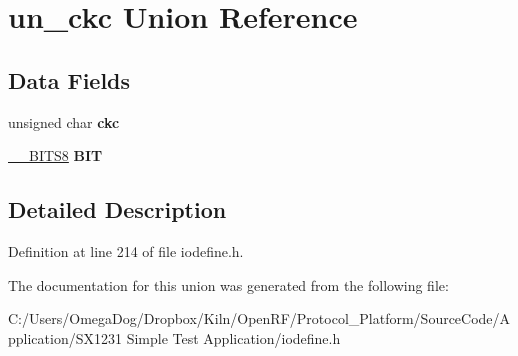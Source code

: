 \hypertarget{unionun__ckc}{\section{un\-\_\-ckc Union Reference}
\label{unionun__ckc}
}
\subsection*{Data Fields}
\begin{DoxyCompactItemize}
\item 
\hypertarget{unionun__ckc_a24fd228220c4303928865689a3bc968e}{unsigned char {\bfseries ckc}}\label{unionun__ckc_a24fd228220c4303928865689a3bc968e}

\item 
\hypertarget{unionun__ckc_a0dcec4a437c9c402864660ba7a64907b}{\hyperlink{struct_____b_i_t_s8}{\-\_\-\-\_\-\-B\-I\-T\-S8} {\bfseries B\-I\-T}}\label{unionun__ckc_a0dcec4a437c9c402864660ba7a64907b}

\end{DoxyCompactItemize}


\subsection{Detailed Description}


Definition at line 214 of file iodefine.\-h.



The documentation for this union was generated from the following file\-:\begin{DoxyCompactItemize}
\item 
C\-:/\-Users/\-Omega\-Dog/\-Dropbox/\-Kiln/\-Open\-R\-F/\-Protocol\-\_\-\-Platform/\-Source\-Code/\-Application/\-S\-X1231 Simple Test Application/iodefine.\-h\end{DoxyCompactItemize}
